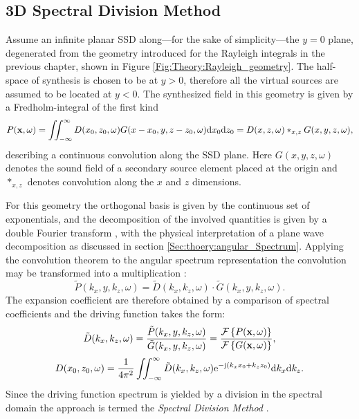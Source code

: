 \subsection{3D Spectral Division Method}

Assume an infinite planar SSD along---for the sake of simplicity---the $y = 0$ plane, degenerated from the geometry introduced for the Rayleigh integrals in the previous chapter, shown in Figure \ref{Fig:Theory:Rayleigh_geometry}.
The half-space of synthesis is chosen to be at $y>0$, therefore all the virtual sources are assumed to be located at $y<0$.
The synthesized field in this geometry is given by a Fredholm-integral of the first kind 
\begin{equation}
P(\mathbf{x},\omega) = \iint_{-\infty}^{\infty} D(x_0,z_0,\omega) G(x-x_0,y,z-z_0, \omega) \mathrm{d} x_0 \mathrm{d} z_0 = D(x,z,\omega)\ast_{x,z} G(x,y,z,\omega),
\end{equation}
describing a continuous convolution along the SSD plane.
Here $G(x,y,z,\omega)$ denotes the sound field of a secondary source element placed at the origin and $\ast_{x,z}$ denotes convolution along the $x$ and $z$ dimensions.

For this geometry the orthogonal basis is given by the continuous set of exponentials, and the decomposition of the involved quantities is given by a double Fourier transform \cite{Ahrens2012, Arfken2005,Schultz2014:Comparing_approaches}, with the physical interpretation of a plane wave decomposition as discussed in section \ref{Sec:thoery:angular_Spectrum}.
Applying the convolution theorem to the angular spectrum representation the convolution may be transformed into a multiplication \cite{Girod2001}:
\begin{equation}
\tilde{P}(k_x,y,k_z, \omega) = \tilde{D}(k_x,k_z, \omega) \cdot \tilde{G}(k_x,y,k_z, \omega).
\end{equation}
%
The expansion coefficient are therefore obtained by a comparison of spectral coefficients and the driving function takes the form:
\begin{equation}
\tilde{D}(k_x,k_z,\omega) = \frac{\tilde{P}(k_x,y,k_z, \omega)}{ \tilde{G}(k_x,y,k_z, \omega)} = 
\frac{\mathcal{F}\left\{ P(\mathbf{x},\omega) \right\} }
{  \mathcal{F}\left\{ G(\mathbf{x},\omega) \right\} },
\label{Eq:Theory:Dkxkz}
\end{equation}
\begin{equation}
D(x_0,z_0,\omega) = \frac{1}{4\pi^2} \iint_{-\infty}^{\infty} \tilde{D}(k_x,k_z, \omega) \mathrm{e}^{-\mathrm{j} (k_x x_0 + k_z z_0)} \mathrm{d} k_x \mathrm{d} k_z.
\label{Eq:Theory:Dkx_inverse_Fourier}
\end{equation}
Since the driving function spectrum is yielded by a division in the spectral domain the approach is termed the \emph{Spectral Division Method} \cite{Ahrens2010a, Ahrens2012:Ambisonics_for_planar_linear, Ahrens2011:icassp, Ahrens2010:Ambisonics_w_planar_linear}.

